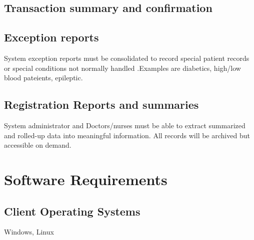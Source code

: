 \documentclass[a4paper]{article}
\begin{document}
\subsection{Transaction summary and confirmation}

\subsection{Exception reports}

System exception reports must be consolidated to record special patient records or special conditions not normally handled .Examples are diabetics, high/low blood pateients, epileptic.

\subsection{Registration Reports and summaries}

System administrator and Doctors/nurses must be able to extract summarized and rolled-up data into meaningful information. All records will be archived but accessible on demand.

\section{Software Requirements}

\subsection{Client Operating Systems}

Windows, Linux
	
\end{document}
